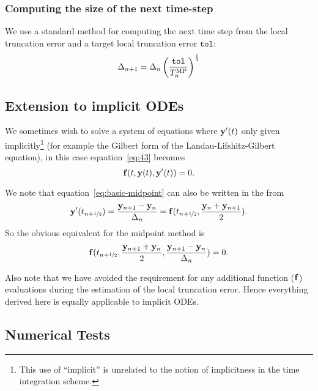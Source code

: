 \subsubsection{Computing the size of the next time-step}

We use a standard method for computing the next time step from the local truncation error and a target local truncation error $\texttt{tol}$:\cite[pg.268]{Gresho-Sani}
\begin{equation}
\Delta_{n+1} = \Delta_{n} \left( \frac{\texttt{tol}}{T_n^{\text{MP}}}  \right) ^{\frac{1}{3}}
\end{equation}

\subsection{Extension to implicit ODEs}

We sometimes wish to solve a system of equations where $\mathbf{y}'(t)$ only given implicitly\footnote{This use of ``implicit'' is unrelated to the notion of implicitness in the time integration scheme.} (for example the Gilbert form of the Landau-Lifshitz-Gilbert equation), in this case equation~\eqref{eq:43} becomes
\begin{equation}
  {\mathbf{f}}(t, \mathbf{y}(t), \mathbf{y}'(t)) = 0.
\end{equation}

We note that equation~\eqref{eq:basic-midpoint} can also be written in the from
\begin{equation}
  \mathbf{y}'(t_{n+\nicefrac{1}{2}}) = \frac{\mathbf{y}_{n+1} - \mathbf{y}_n}{\Delta_{n}} =  {\mathbf{f}}(t_{n+\nicefrac{1}{2}}, \frac{\mathbf{y}_n + \mathbf{y}_{n+1}}{2}).
\end{equation}
So the obvious equivalent for the midpoint method is
\begin{equation}
  {\mathbf{f}}(t_{n+\nicefrac{1}{2}}, \frac{\mathbf{y}_{n+1} + \mathbf{y}_n}{2}, \frac{\mathbf{y}_{n+1} - \mathbf{y}_n}{\Delta_{n}}) = 0.
\end{equation}

Also note that we have avoided the requirement for any additional function (\ie ${\mathbf{f}}$) evaluations during the estimation of the local truncation error.
Hence everything derived here is equally applicable to implicit ODEs.

\subsection{Numerical Tests}





